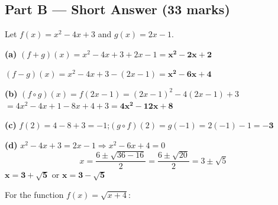 \documentclass[addpoints]{exam}
\begin{document}
\begin{questions}
\section*{Part B --- Short Answer (33 marks)}

\question Let $f(x) = x^2 - 4x + 3$ and $g(x) = 2x - 1$.
\begin{solution}[10cm]
\textbf{(a)} $(f+g)(x) = x^2 - 4x + 3 + 2x - 1 = \mathbf{x^2 - 2x + 2}$

$(f-g)(x) = x^2 - 4x + 3 - (2x-1) = \mathbf{x^2 - 6x + 4}$

\textbf{(b)} $(f\circ g)(x) = f(2x-1) = (2x-1)^2 - 4(2x-1) + 3$
$= 4x^2 - 4x + 1 - 8x + 4 + 3 = \mathbf{4x^2 - 12x + 8}$

\textbf{(c)} $f(2) = 4 - 8 + 3 = -1$;\quad $(g\circ f)(2) = g(-1) = 2(-1)-1 = \mathbf{-3}$

\textbf{(d)} $x^2 - 4x + 3 = 2x - 1 \Rightarrow x^2 - 6x + 4 = 0$
\[
x = \frac{6 \pm \sqrt{36-16}}{2} = \frac{6 \pm \sqrt{20}}{2} = 3 \pm \sqrt{5}
\]
$\mathbf{x = 3 + \sqrt{5}}$ or $\mathbf{x = 3 - \sqrt{5}}$
\end{solution}

\question For the function $f(x) = \sqrt{x + 4}$:
\end{questions}
\end{document}
